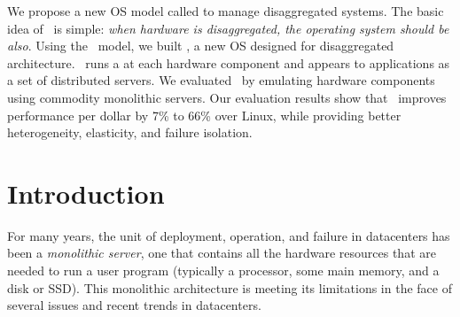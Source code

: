 \documentclass[10pt,times,twocolumn]{z2-article}
\begin{document}
We propose a new OS model called {\em \splitkernel} to manage disaggregated systems.
The basic idea of \splitkernel\ is simple: 
\textit{when hardware is disaggregated, the operating system should be also}.  
Using the \splitkernel\ model, we built \lego, 
a new OS designed for disaggregated architecture. 
\lego\ runs a {\em \microos} at each hardware component
and appears to applications as a set of distributed servers.
We evaluated \lego\ by emulating hardware components using commodity monolithic servers.
Our evaluation results show that \lego\ improves performance per dollar by 7\% to 66\% over Linux,
while providing better heterogeneity, elasticity, and failure isolation.
\fi


\section{Introduction}
\label{sec:introduction}




For many years, the unit of deployment, operation, and failure in datacenters has been a {\em monolithic server},
one that contains all the hardware resources 
that are needed to run a user program
(typically a processor, some main memory, and a disk or SSD).
This monolithic architecture is meeting its limitations in the face of 
several issues and recent trends in datacenters.
\end{document}
